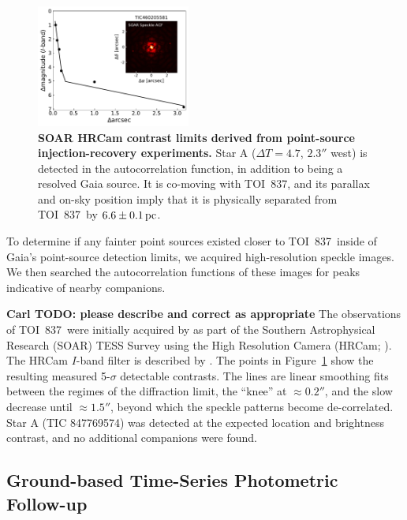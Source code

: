 \documentclass[12pt,twocolumn,tighten]{aastex63}
\newcommand{\tn}{TOI~837} %
\begin{document}
\begin{figure}[!t]
	\begin{center}
		\leavevmode
		\includegraphics[width=0.45\textwidth]{f6.pdf}
	\end{center}
	\vspace{-0.7cm}
	\caption{ 
    {\bf SOAR HRCam contrast limits derived from point-source
    injection-recovery experiments.} Star A ($\Delta T=4.7$,
    $2.3''$ west) is detected in the autocorrelation function, in
    addition to being a resolved Gaia source.  It is co-moving with
    \tn, and its parallax and on-sky position imply that it is
    physically separated from \tn\ by $6.6\pm 0.1\,{\rm pc}$.
		\label{fig:soar}
	}
\end{figure}

To determine if any fainter point sources existed closer to \tn\
inside of Gaia's point-source detection limits, we acquired
high-resolution speckle images. We then searched the autocorrelation
functions of these images for peaks indicative of nearby companions.

{\bf Carl TODO: please describe and correct as appropriate}
The observations of \tn\ were initially acquired by
\citet{ziegler_soar_2020} as part of the Southern Astrophysical
Research (SOAR) TESS Survey using the High Resolution Camera (HRCam;
\citealt{tokovinin_ten_2018}).  The HRCam $I$-band filter is described
by \citet{tokovinin_ten_2018}.  The points in Figure~\ref{fig:soar}
show the resulting measured 5-$\sigma$ detectable contrasts.  The
lines are linear smoothing fits between the regimes of the diffraction
limit, the ``knee'' at $\approx 0.2''$, and the slow decrease until
$\approx 1.5''$, beyond which the speckle patterns become
de-correlated.  Star A (TIC 847769574) was detected at the expected
location and brightness contrast, and no additional companions were
found.



\subsection{Ground-based Time-Series Photometric Follow-up}
\label{subsec:groundphot}
\end{document}
